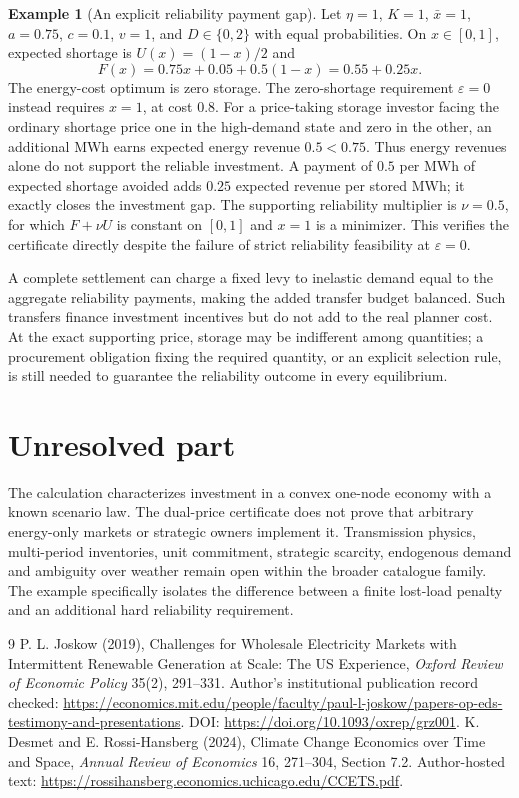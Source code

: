 \documentclass[11pt]{article}
\theoremstyle{definition}
\newtheorem{example}{Example}
\begin{document}
\begin{example}[An explicit reliability payment gap]
Let $\eta=1$, $K=1$, $\bar x=1$, $a=0.75$, $c=0.1$, $v=1$, and $D\in\{0,2\}$ with equal probabilities. On $x\in[0,1]$, expected shortage is $U(x)=(1-x)/2$ and
\[
 F(x)=0.75x+0.05+0.5(1-x)=0.55+0.25x.
\]
The energy-cost optimum is zero storage. The zero-shortage requirement $\varepsilon=0$ instead requires $x=1$, at cost $0.8$. For a price-taking storage investor facing the ordinary shortage price one in the high-demand state and zero in the other, an additional MWh earns expected energy revenue $0.5<0.75$. Thus energy revenues alone do not support the reliable investment. A payment of $0.5$ per MWh of expected shortage avoided adds $0.25$ expected revenue per stored MWh; it exactly closes the investment gap. The supporting reliability multiplier is $\nu=0.5$, for which $F+\nu U$ is constant on $[0,1]$ and $x=1$ is a minimizer. This verifies the certificate directly despite the failure of strict reliability feasibility at $\varepsilon=0$.
\end{example}
A complete settlement can charge a fixed levy to inelastic demand equal to the aggregate reliability payments, making the added transfer budget balanced. Such transfers finance investment incentives but do not add to the real planner cost. At the exact supporting price, storage may be indifferent among quantities; a procurement obligation fixing the required quantity, or an explicit selection rule, is still needed to guarantee the reliability outcome in every equilibrium.

\section*{Unresolved part}
The calculation characterizes investment in a convex one-node economy with a known scenario law. The dual-price certificate does not prove that arbitrary energy-only markets or strategic owners implement it. Transmission physics, multi-period inventories, unit commitment, strategic scarcity, endogenous demand and ambiguity over weather remain open within the broader catalogue family. The example specifically isolates the difference between a finite lost-load penalty and an additional hard reliability requirement.
\begin{thebibliography}{9}
 P. L. Joskow (2019), Challenges for Wholesale Electricity Markets with Intermittent Renewable Generation at Scale: The US Experience, \emph{Oxford Review of Economic Policy} 35(2), 291--331. Author's institutional publication record checked: \url{https://economics.mit.edu/people/faculty/paul-l-joskow/papers-op-eds-testimony-and-presentations}. DOI: \url{https://doi.org/10.1093/oxrep/grz001}.
 K. Desmet and E. Rossi-Hansberg (2024), Climate Change Economics over Time and Space, \emph{Annual Review of Economics} 16, 271--304, Section 7.2. Author-hosted text: \url{https://rossihansberg.economics.uchicago.edu/CCETS.pdf}.
\end{thebibliography}
\end{document}
